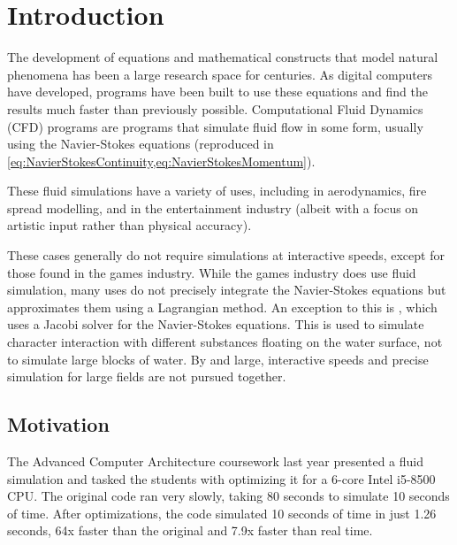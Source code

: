 
\chapter{Introduction}
\label{sec:Introduction} 
The development of equations and mathematical constructs that model natural phenomena has been a large research space for centuries.
As digital computers have developed, programs have been built to use these equations and find the results much faster than previously possible\cite{AtomicHeritageFoundationComputingProject}.
Computational Fluid Dynamics (CFD) programs are programs that simulate fluid flow in some form, usually using the Navier-Stokes equations (reproduced in \cref{eq:NavierStokesContinuity,eq:NavierStokesMomentum}).

These fluid simulations have a variety of uses,
including in aerodynamics\cite{jameson2002},%
fire spread modelling\cite{Sullivan_2009},
and in the entertainment industry (albeit with a focus on artistic input rather than physical accuracy\cite{article:FluidDynamicsOnBigScreen}).

These cases generally do not require simulations at interactive speeds, except for those found in the games industry.
While the games industry does use fluid simulation\cite{paper:GameFluidSummary:medveckyreal}, many uses do not precisely integrate the Navier-Stokes equations but approximates them \cite{paper:StableFluids:10.1145/311535.311548} using a Lagrangian method.
An exception to this is \cite{presentation:RealtimeFluidSimTombRaider}, which uses a Jacobi solver for the Navier-Stokes equations. This is used to simulate character interaction with different substances floating on the water surface\cite{presentation:RealtimeFluidSimTombRaider}, not to simulate large blocks of water.
By and large, interactive speeds and precise simulation for large fields are not pursued together.

\section{Motivation}
The Advanced Computer Architecture coursework last year presented a fluid simulation and tasked the students with optimizing it for a 6-core Intel i5-8500 CPU\cite{modules:CS257Coursework}.
The original code ran very slowly, taking 80 seconds to simulate 10 seconds of time. %
After optimizations, the code simulated 10 seconds of time in just 1.26 seconds, 64x faster than the original and 7.9x faster than real time.\cite{modules:aca257submission}

